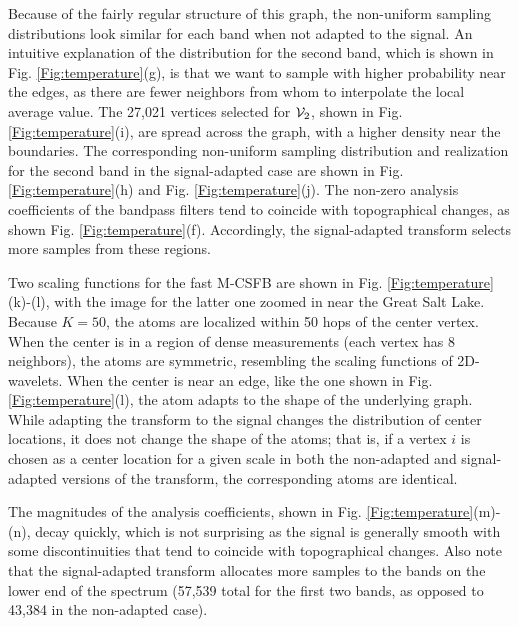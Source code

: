 \documentclass[journal, 10pt]{IEEEtran}
\begin{document}
Because of the fairly regular structure of this graph, the non-uniform sampling distributions look similar for each band when not adapted to the signal. An intuitive explanation of the distribution for the second band, which is shown in Fig. \ref{Fig:temperature}(g), is that we want to sample with higher probability near the edges, as there are fewer neighbors from whom to interpolate the local average value. The 27,021 vertices selected for ${\mathcal{V}}_2$, shown in Fig. \ref{Fig:temperature}(i), are spread across the graph, with a higher density near the boundaries. The corresponding non-uniform sampling distribution and realization for the second band in the signal-adapted case are shown in Fig. \ref{Fig:temperature}(h) and Fig. \ref{Fig:temperature}(j). The non-zero analysis coefficients of the bandpass filters tend to coincide with topographical changes, as shown Fig. \ref{Fig:temperature}(f). Accordingly, the signal-adapted transform selects more samples from these regions.

Two scaling functions for the fast M-CSFB are shown in Fig. \ref{Fig:temperature}(k)-(l), with the image for the latter one zoomed in near the Great Salt Lake. Because $K=50$, the atoms are localized within 50 hops of the center vertex. When the center is in a region of dense measurements (each vertex has 8 neighbors), the atoms are symmetric, resembling the scaling functions of 2D-wavelets. When the center is near an edge, like the one shown in Fig. \ref{Fig:temperature}(l), the atom adapts to the shape of the underlying graph. While adapting the transform to the signal changes the distribution of center locations, it does not change the shape of the atoms; that is, if a vertex $i$ is chosen as a center location for a given scale in both the non-adapted and signal-adapted versions of the transform, the corresponding atoms are identical. 

The magnitudes of the analysis coefficients, shown in Fig. \ref{Fig:temperature}(m)-(n), decay quickly, which is not surprising as the signal is generally smooth with some discontinuities that tend to coincide with topographical changes. Also note that the signal-adapted transform allocates more samples to the bands on the lower end of the spectrum (57,539 total for the first two bands, as opposed to 43,384 in the non-adapted case).
\end{document}
